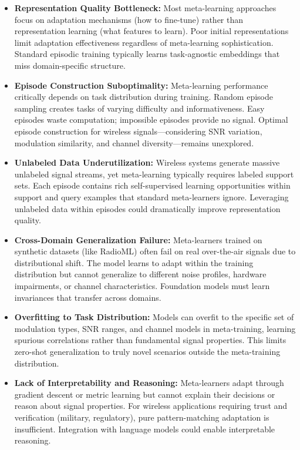 \begin{itemize}
    \item \textbf{Representation Quality Bottleneck:} Most meta-learning approaches focus on adaptation mechanisms (how to fine-tune) rather than representation learning (what features to learn)\cite{}. Poor initial representations limit adaptation effectiveness regardless of meta-learning sophistication\cite{}. Standard episodic training typically learns task-agnostic embeddings that miss domain-specific structure\cite{}.
    
    \item \textbf{Episode Construction Suboptimality:} Meta-learning performance critically depends on task distribution during training\cite{}. Random episode sampling creates tasks of varying difficulty and informativeness\cite{}. Easy episodes waste computation; impossible episodes provide no signal. Optimal episode construction for wireless signals—considering SNR variation, modulation similarity, and channel diversity—remains unexplored.
    
    \item \textbf{Unlabeled Data Underutilization:} Wireless systems generate massive unlabeled signal streams\cite{}, yet meta-learning typically requires labeled support sets\cite{}. Each episode contains rich self-supervised learning opportunities within support and query examples that standard meta-learners ignore\cite{}. Leveraging unlabeled data within episodes could dramatically improve representation quality.
    
    \item \textbf{Cross-Domain Generalization Failure:} Meta-learners trained on synthetic datasets (like RadioML\cite{}) often fail on real over-the-air signals due to distributional shift\cite{}. The model learns to adapt within the training distribution but cannot generalize to different noise profiles, hardware impairments, or channel characteristics\cite{}. Foundation models must learn invariances that transfer across domains.
    
    \item \textbf{Overfitting to Task Distribution:} Models can overfit to the specific set of modulation types, SNR ranges, and channel models in meta-training, learning spurious correlations rather than fundamental signal properties\cite{}. This limits zero-shot generalization to truly novel scenarios outside the meta-training distribution.
    
    \item \textbf{Lack of Interpretability and Reasoning:} Meta-learners adapt through gradient descent or metric learning but cannot explain their decisions or reason about signal properties\cite{}. For wireless applications requiring trust and verification (military, regulatory), pure pattern-matching adaptation is insufficient\cite{}. Integration with language models could enable interpretable reasoning.
\end{itemize}

